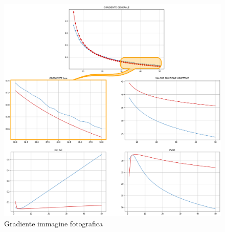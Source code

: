 \begin{figure}[H]
    \centering
    \includegraphics[width=\textwidth]{output/MGCvsMG-pugile-enph.png}
    \caption{Gradiente immagine fotografica}
    \label{fig:errorOutput}
\end{figure}

